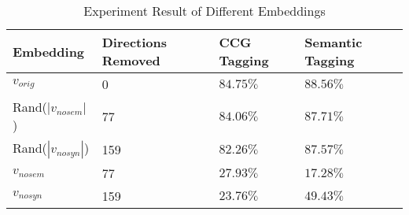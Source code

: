 \documentclass[11pt,a4paper]{article}
\begin{document}
\begin{table*}[h]
    \centering
    \begin{tabular}{llll}
    \hline
    \textbf{Embedding} & \textbf{Directions Removed} & \textbf{CCG Tagging} &\textbf{Semantic Tagging} \\
    \hline
    $v_{orig}$ & 0 & $84.75\%$ & $88.56\%$ \\
    \hline

    Rand($|v_{nosem}|$) & 77 & $84.06\%$ & $87.71\%$ \\
    Rand($|v_{nosyn}|$) & 159 & $82.26\%$ & $87.57\%$ \\
    \hline
    $v_{nosem}$ & 77 & $27.93\%$ & $17.28\%$ \\
    $v_{nosyn}$ & 159 & $23.76\%$ & $49.43\%$ \\
    \hline
    \hline
    \end{tabular}
    \caption{\label{role description} Experiment Result of Different Embeddings
    }
    \end{table*}

\end{document}
